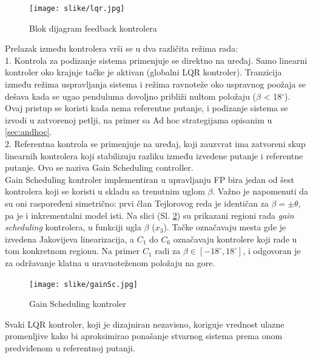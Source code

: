 \documentclass[a4paper,11pt]{article}
\theoremstyle{definition} \newtheorem{deff}{Definicija}[section]
\theoremstyle{definition} \newtheorem{prim}[deff]{Primer}
\theoremstyle{plain} \newtheorem{teor}[deff]{Teorema}
\begin{document}
	\begin{figure}[!h]
		\centering
		\texttt{[image: slike/lqr.jpg]}
		\caption{Blok dijagram feedback kontrolera \cite{inicijalna}}
		\label{fig:lqr}
	\end{figure}
	
	
	
	Prelazak između kontrolera vrši se u dva različita režima rada: \\
	
	1. Kontrola za podizanje sistema primenjuje se direktno na uređaj. Samo linearni kontroler oko krajnje tačke je aktivan (globalni LQR kontroler). Tranzicija između režima uspravljanja sistema i režima ravnoteže oko uspravnog poožaja se dešava kada se ugao penduluma dovoljno približi nultom položaju ($\beta$ < 18$^\circ$). Ovaj pristup se koristi kada nema referentne putanje, i podizanje sistema se izvodi u zatvorenoj petlji, na primer sa Ad hoc strategijama opisanim u \ref{sec:andhoc}. \\
	
	2. Referentna kontrola se primenjuje na uređaj, koji zauzvrat ima zatvoreni skup linearnih kontrolera koji stabilizuju razliku između izvedene putanje i referentne putanje. Ovo se naziva Gain Scheduling controller.\\
	
	Gain Scheduling kontroler implementiran u upravljanju FP bira jedan od šest kontrolera koji se koristi u skladu sa trenutnim uglom $\beta$. Važno je napomenuti da su oni raspoređeni simetrično: prvi član Tejlorovog reda je identičan za $\beta = \pm \theta$, pa je i inkrementalni model isti. 
	Na slici (Sl. \ref{fig:ganSc}) su prikazani regioni rada \emph{gain scheduling} kontrolera, u funkciji ugla $\beta$ ($x_3$). Tačke označavaju mesta gde je izvedena Jakovijeva linearizacija, a $C_1$ do $C_6$ označavaju kontrolere koji rade u tom konkretnom regionu. Na primer $C_1$ radi za $\beta \in [-18^\circ, 18^\circ]$, i odgovoran je za održavanje klatna u uravnoteženom položaju na gore.
	
	\begin{figure}[!h]
		\centering
		\texttt{[image: slike/gainSc.jpg]}
		\caption{Gain Scheduling kontroler \cite{inicijalna}}
		\label{fig:ganSc}
	\end{figure}
	
	Svaki LQR kontroler, koji je dizajniran nezavisno, koriguje vrednost ulazne promenljive kako bi aproksimirao ponašanje stvarnog sistema prema onom predviđenom u referentnoj putanji.\\
	
\end{document}

